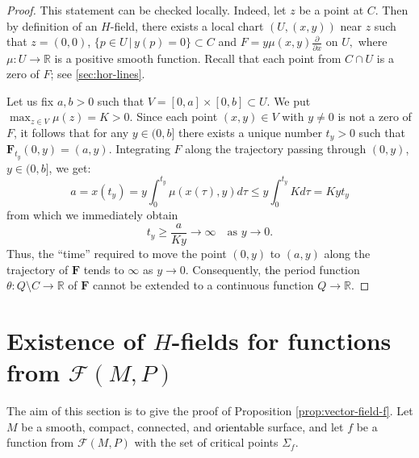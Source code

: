 \documentclass[10pt,reqno]{amsart}
\newcommand{\bbR}{\mathbb{R}}
\newcommand{\bfF}{\mathbf{F}}
\newcommand{\F}{\mathcal{F}(M,P)}
\newcommand{\Crit}{\Sigma_f}
\newcommand{\textr}[1]{\textcolor{black}{#1}}
\begin{document}
\begin{proof}
This statement can be checked locally. Indeed, 	
let $z$ be a point at $C$. Then by definition of an $H$-field, there exists a local chart $(U,(x,y))$ near $z$ such that $z = (0,0)$, $\{p\in U\,|\,y(p) = 0 \}\subset C$ and
 $F = y\mu(x,y)\frac{\partial}{\partial x}$ on $U,$ where $\mu:U\to \bbR$ is a positive smooth function.  Recall that each point from $C\cap U$ is a zero of $F$; see \textsection\ref{sec:hor-lines}. 
 

Let us fix $a,b> 0$  such that  $V = [0,a]\times [0,b]\subset U$.  We put $\max_{z\in V}\mu(z) = K>0$.
Since each point $(x,y)\in V$ with $y\neq 0$  is not a zero of $F$, it follows that  for any $y\in (0,b]$ there exists a unique number $t_y>0$ such that $\bfF_{t_y}(0,y) = (a,y)$. 
Integrating $F$ along the trajectory passing through $(0,y)$, $y\in (0,b]$, we get:
$$
a = x(t_y) = y\int_{0}^{t_y}\mu(x(\tau), y)d\tau\leq y\int_{0}^{t_y}Kd\tau = Kyt_y
$$
from which we immediately obtain
\begin{equation}\label{eq:t_y}
t_y\geq \frac{a}{Ky}\longrightarrow \infty\quad\text{as } y\to 0.
\end{equation}
Thus, the ``time'' required to move the point $(0,y)$ to $(a,y)$ along the trajectory of $\bfF$ tends to $\infty$ as $y\to 0.$ Consequently, \textr{the} period function $\theta:Q\setminus C\to \bbR$ of $\bfF$ cannot be extended to a continuous function $Q\to \bbR$.
\end{proof}

\section{Existence of $H$-fields for functions from $\F$}\label{sec:existence}
The aim of this section is to give the proof of Proposition \ref{prop:vector-field-f}.
Let $M$ be a smooth,  compact, connected, and \textr{orientable} surface, and let  $f$ be a function from $\F$ with the set of critical points $\Crit$.
\end{document}
